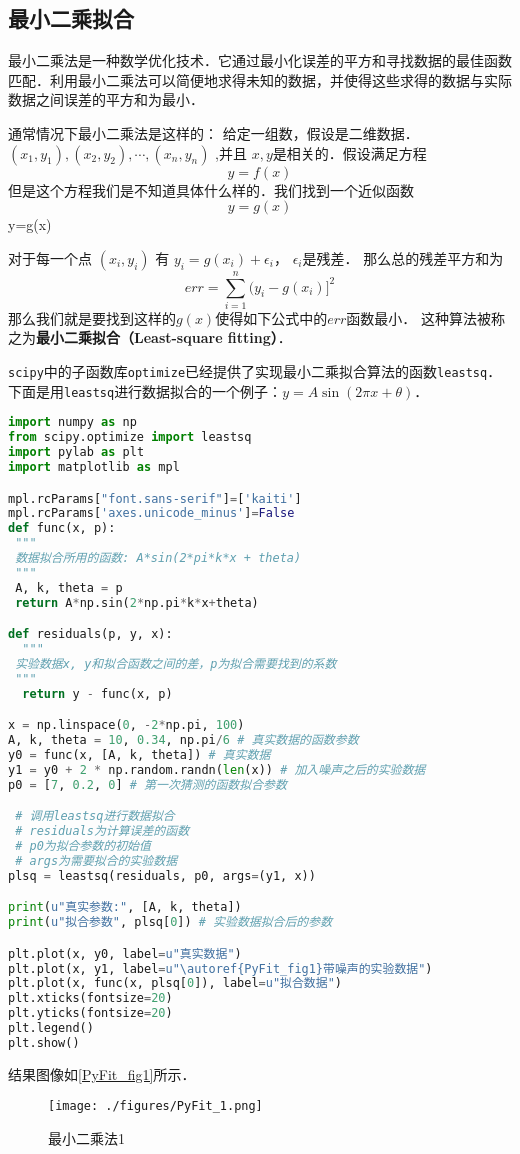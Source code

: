 
\subsection{最小二乘拟合}
最小二乘法是一种数学优化技术．它通过最小化误差的平方和寻找数据的最佳函数匹配．利用最小二乘法可以简便地求得未知的数据，并使得这些求得的数据与实际数据之间误差的平方和为最小．

通常情况下最小二乘法是这样的： 给定一组数，假设是二维数据．$(x_1,y_1),(x_2,y_2),\cdots,(x_n,y_n)$ ,并且 $x,y$是相关的．假设满足方程
\begin{equation}
y=f(x)
\end{equation}
但是这个方程我们是不知道具体什么样的．我们找到一个近似函数
\begin{equation}
y=g(x)
\end{equation}
y=g(x)

对于每一个点 $(x_i,y_i)$ 有 $y_i=g(x_i)+\epsilon_i$， $\epsilon_i$是残差． 那么总的残差平方和为
\begin{equation}
err=\sum_{i=1}^n(y_i-g(x_i)]^2
\end{equation}
那么我们就是要找到这样的$g(x)$使得如下公式中的$err$函数最小． 这种算法被称之为\textbf{最小二乘拟合（Least-square fitting）}．

\verb|scipy|中的子函数库\verb|optimize|已经提供了实现最小二乘拟合算法的函数\verb|leastsq|．下面是用\verb|leastsq|进行数据拟合的一个例子：$y=A\sin(2\pi x+\theta)$．
\begin{lstlisting}[language=python]
import numpy as np
from scipy.optimize import leastsq
import pylab as plt
import matplotlib as mpl

mpl.rcParams["font.sans-serif"]=['kaiti']
mpl.rcParams['axes.unicode_minus']=False
def func(x, p):
 """
 数据拟合所用的函数: A*sin(2*pi*k*x + theta)
 """
 A, k, theta = p
 return A*np.sin(2*np.pi*k*x+theta)

def residuals(p, y, x):
  """
 实验数据x, y和拟合函数之间的差，p为拟合需要找到的系数
 """
  return y - func(x, p)

x = np.linspace(0, -2*np.pi, 100)
A, k, theta = 10, 0.34, np.pi/6 # 真实数据的函数参数
y0 = func(x, [A, k, theta]) # 真实数据
y1 = y0 + 2 * np.random.randn(len(x)) # 加入噪声之后的实验数据
p0 = [7, 0.2, 0] # 第一次猜测的函数拟合参数

 # 调用leastsq进行数据拟合
 # residuals为计算误差的函数
 # p0为拟合参数的初始值
 # args为需要拟合的实验数据
plsq = leastsq(residuals, p0, args=(y1, x))

print(u"真实参数:", [A, k, theta])
print(u"拟合参数", plsq[0]) # 实验数据拟合后的参数

plt.plot(x, y0, label=u"真实数据")
plt.plot(x, y1, label=u"\autoref{PyFit_fig1}带噪声的实验数据")
plt.plot(x, func(x, plsq[0]), label=u"拟合数据")
plt.xticks(fontsize=20)
plt.yticks(fontsize=20)
plt.legend()
plt.show()
\end{lstlisting}
结果图像如\autoref{PyFit_fig1}所示．
\begin{figure}[ht]
\centering
\texttt{[image: ./figures/PyFit\_1.png]}
\caption{最小二乘法1} \label{PyFit_fig1}
\end{figure}

